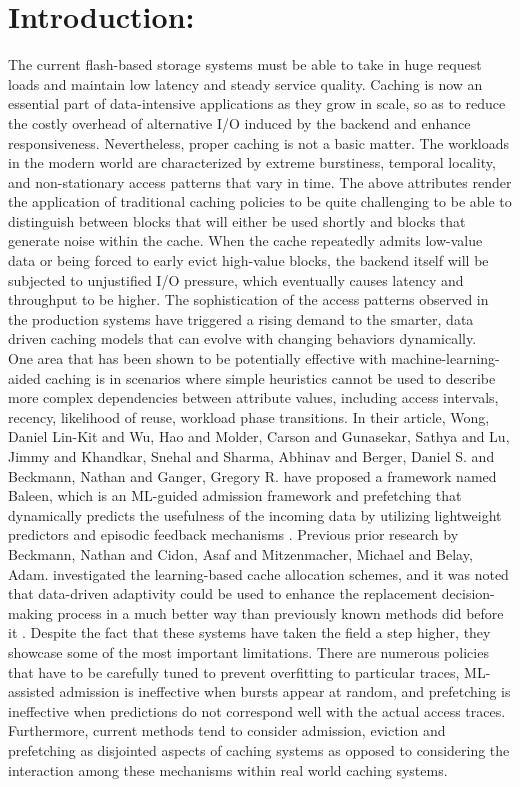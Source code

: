 \documentclass[sigconf]{acmart}
\begin{document}
{\section{Introduction:}
\large The current flash-based storage systems must be able to take in huge request loads and maintain low latency and steady service quality. Caching is now an essential part of data-intensive applications as they grow in scale, so as to reduce the costly overhead of alternative I/O induced by the backend and enhance responsiveness. Nevertheless, proper caching is not a basic matter. The workloads in the modern world are characterized by extreme burstiness, temporal locality, and non-stationary access patterns that vary in time. The above attributes render the application of traditional caching policies to be quite challenging to be able to distinguish between blocks that will either be used shortly and blocks that generate noise within the cache. When the cache repeatedly admits low-value data or being forced to early evict high-value blocks, the backend itself will be subjected to unjustified I/O pressure, which eventually causes latency and throughput to be higher. The sophistication of the access patterns observed in the production systems have triggered a rising demand to the smarter, data driven caching models that can evolve with changing behaviors dynamically.\\\indent One area that has been shown to be potentially effective with machine-learning-aided caching is in scenarios where simple heuristics cannot be used to describe more complex dependencies between attribute values, including access intervals, recency, likelihood of reuse, workload phase transitions. In their article, Wong, Daniel Lin-Kit and Wu, Hao and Molder, Carson and Gunasekar, Sathya and Lu, Jimmy and Khandkar, Snehal and Sharma, Abhinav and Berger, Daniel S. and Beckmann, Nathan and Ganger, Gregory R. have proposed a framework named Baleen, which is an ML-guided admission framework and prefetching that dynamically predicts the usefulness of the incoming data by utilizing lightweight predictors and episodic feedback mechanisms \cite{baleen_artifact}. Previous prior research by Beckmann, Nathan and Cidon, Asaf and Mitzenmacher, Michael and Belay, Adam. investigated the learning-based cache allocation schemes, and it was noted that data-driven adaptivity could be used to enhance the replacement decision-making process in a much better way than previously known methods did before it \cite{beckmann2015optimizing}. Despite the fact that these systems have taken the field a step higher, they showcase some of the most important limitations. There are numerous policies that have to be carefully tuned to prevent overfitting to particular traces, ML-assisted admission is ineffective when bursts appear at random, and prefetching is ineffective when predictions do not correspond well with the actual access traces. Furthermore, current methods tend to consider admission, eviction and prefetching as disjointed aspects of caching systems as opposed to considering the interaction among these mechanisms within real world caching systems.\\
}
\end{document}
